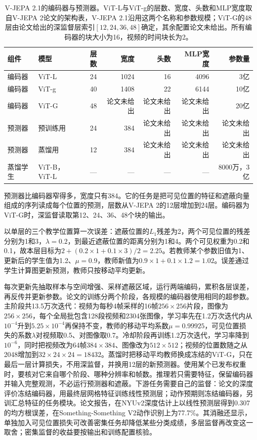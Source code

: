 \begin{table}[tbp]
  \centering
  \small
  \begin{tabular}{@{}llrrrrr@{}}
    \toprule
    组件 & 模型 & 层数 & 宽度 & 头数 & MLP宽度 & 参数量\\
    \midrule
    编码器 & ViT-L & 24 & 1024 & 16 & 4096 & 3亿\\
    编码器 & ViT-g & 40 & 1408 & 22 & 6144 & 10亿\\
    编码器 & ViT-G & 48 & 论文未给出 & 论文未给出 & 论文未给出 & 20亿\\
    预测器 & 预训练用 & 24 & 384 & 论文未给出 & 论文未给出 & 论文未给出\\
    预测器 & 蒸馏用 & 12 & 384 & 论文未给出 & 论文未给出 & 论文未给出\\
    蒸馏学生 & ViT-B，ViT-L & — & — & — & — & 8000万，3亿\\
    \bottomrule
  \end{tabular}
  \caption{V-JEPA 2.1的编码器与预测器。ViT-L与ViT-g的层数、宽度、头数和MLP宽度取自V-JEPA 2论文的架构表，V-JEPA 2.1沿用这两个名称和参数规模；ViT-G的48层由论文给出的深监督层索引$[12,24,36,48]$确定，其余配置论文未给出。所有编码器的块大小为16，视频的时间块长为2。}
  \label{tab:vision-ivm-vjepa-configs}
\end{table}

预测器比编码器窄得多，宽度只有384。它的任务是把可见位置的特征和遮蔽向量组成的序列读成每个位置的预测，层数从V-JEPA 2的12层增加到24层。编码器为ViT-G时，深监督读取第12、24、36、48个块的输出。

以单层的三个教学位置算一次误差：遮蔽位置的$L_1$残差为2，两个可见位置的残差分别为1和3，$\lambda=0.2$，到最近遮蔽位置的距离分别为1和4。两个可见权重为0.2和0.1，故本层目标为$2+(0.2\times1+0.1\times3)/2=2.25$。若教师某个参数旧值为1、更新后的学生值为1.2、$\mu=0.9$，教师新值为$0.9\times1+0.1\times1.2=1.02$。误差通过学生计算图更新预测，教师只按移动平均更新。

每次更新先抽取样本与空间增强、采样遮蔽区域，运行两端编码，累积各层误差，再反传并更新参数。论文的训练分两个阶段，各规模的编码器使用相同的超参数。主阶段共13.5万次迭代：视频为每秒4帧采样的16帧$256\times256$片段，图像为$256\times256$，每个全局批包含128段视频和2304张图像，学习率先在1.2万次迭代内从$10^{-4}$升到$5.25\times10^{-4}$再保持不变，教师的移动平均系数$\mu=0.99925$，可见位置损失的系数$\lambda$对视频取0.5、对图像取0.7。冷却阶段再训练1.2万次迭代，学习率降到$10^{-6}$，同时把视频改为64帧$384\times384$、图像改为$512\times512$；视频的位置数随之从2048增加到$32\times24\times24=18432$。蒸馏时把移动平均教师换成冻结的ViT-G，只在最后一层计算损失，不用深监督，并换用12层的新预测器。使用某个已发布权重时，要核对它来自哪个阶段、哪种分辨率和帧数。推理若只需要特征，保留编码器并输入完整观测，不必运行预测器和遮蔽。下游任务需要自己的监督：论文的深度评价冻结编码器，用最终层网格特征训练线性预测层；动作预期则冻结编码器，另训汇总特征的任务模块。论文报告，在NYUv2深度估计上以线性预测层得到0.307的均方根误差，在Something-Something V2动作识别上为77.7\%。其消融还显示，单独加入可见位置损失可改善密集任务却降低某些分类成绩，多层监督再改变这一取舍；密集监督的收益要按输出和训练配置核验。


